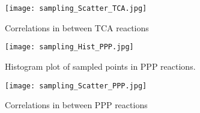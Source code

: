 \begin{landscape}
  \begin{figure}[H]
   \begin{center}
     \begin{sidewaysfigure}
      \texttt{[image: sampling\_Scatter\_TCA.jpg]}
     \end{sidewaysfigure}
   \end{center}
  \caption[Correlations in between TCA reactions]{Correlations in between TCA reactions}
  \label{fig:sampling_Scatter_TCA}
  \end{figure}

   \begin{figure}[H]
    \begin{center}
      \begin{sidewaysfigure}
       \texttt{[image: sampling\_Hist\_PPP.jpg]}
      \end{sidewaysfigure}
    \end{center}
   \caption[Histogram plots of available flux values for PPP reactions]{Histogram plot of sampled points in PPP reactions.}
   \label{fig:sampling_Hist_PPP}
   \end{figure}

   \begin{figure}[H]
    \begin{center}
      \begin{sidewaysfigure}
       \texttt{[image: sampling\_Scatter\_PPP.jpg]}
      \end{sidewaysfigure}
    \end{center}
   \caption[Correlations in between PPP reactions]{Correlations in between PPP reactions}
   \label{fig:sampling_Scatter_PPP}
   \end{figure}
\end{landscape}

